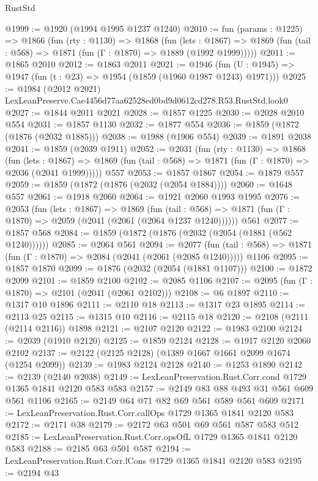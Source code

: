 \begin{lexlean}{RustStd}
\begin{coremodule}
@1999 := @1920 (@1994 @1995 @1237 @1240)
@2010 := fun (params : @1225) =>
  @1866
    (fun (rty : @1130) =>
    @1868
      (fun (lets : @1867) =>
      @1869 (fun (tail : @568) => @1871 (fun (Γ : @1870) => @1889 (@1992 @1999)))))
@2011 := @1865 @2010
@2012 := @1863 @2011
@2021 := @1946 (fun (U : @1945) => @1947 (fun (t : @23) => @1954 (@1859 (@1960 @1987 @1243) @1971)))
@2025 := @1984 (@2012 @2021) LexLeanPreserve.Cae4456d77aa62528ed0bd9d0612cd278.R53.RustStd.look0
@2027 := @1844 @2011 @2021
@2028 := @1857 @1225
@2030 := @2028 @2010 @554
@2031 := @1857 @1130
@2032 := @1877 @554
@2036 := @1859 (@1872 (@1876 (@2032 @1885)))
@2038 := @1988 (@1906 @554)
@2039 := @1891 @2038
@2041 := @1859 (@2039 @1911)
@2052 := @2031
    (fun (rty : @1130) =>
    @1868
      (fun (lets : @1867) =>
      @1869 (fun (tail : @568) => @1871 (fun (Γ : @1870) => @2036 (@2041 @1999)))))
    @557
@2053 := @1857 @1867
@2054 := @1879 @557
@2059 := @1859 (@1872 (@1876 (@2032 (@2054 @1884))))
@2060 := @1648 @557
@2061 := @1918 @2060
@2064 := @1921 @2060 @1993 @1995
@2076 := @2053
    (fun (lets : @1867) =>
    @1869
      (fun (tail : @568) => @1871 (fun (Γ : @1870) => @2059 (@2041 (@2061 (@2064 @1237 @1240))))))
    @561
@2077 := @1857 @568
@2084 := @1859 (@1872 (@1876 (@2032 (@2054 (@1881 (@562 @1240))))))
@2085 := @2064 @561
@2094 := @2077
    (fun (tail : @568) => @1871 (fun (Γ : @1870) => @2084 (@2041 (@2061 (@2085 @1240)))))
    @1106
@2095 := @1857 @1870
@2099 := @1876 (@2032 (@2054 (@1881 @1107)))
@2100 := @1872 @2099
@2101 := @1859 @2100
@2102 := @2085 @1106
@2107 := @2095 (fun (Γ : @1870) => @2101 (@2041 (@2061 @2102)))
@2108 := @6 @1897
@2110 := @1317 @10 @1896
@2111 := @2110 @18
@2113 := @1317 @23 @1895
@2114 := @2113 @25
@2115 := @1315 @10
@2116 := @2115 @18
@2120 := @2108 (@2111 (@2114 @2116)) @1898
@2121 := @2107 @2120
@2122 := @1983 @2100
@2124 := @2039 (@1910 @2120)
@2125 := @1859 @2124
@2128 := @1917 @2120 @2060 @2102
@2137 := @2122 (@2125 @2128) (@1389 @1667 @1661 @2099 @1674 (@1254 @2099))
@2139 := @1983 @2124 @2128
@2140 := @1253 @1890
@2142 := @2139 (@2140 @2038)
@2149 := LexLeanPreservation.Rust.Corr.cond @1729 @1365 @1841 @2120 @583 @583
@2157 := @2149 @83 @88 @493 @31 @561 @609 @561 @1106
@2165 := @2149 @64 @71 @82 @69 @561 @589 @561 @609
@2171 := LexLeanPreservation.Rust.Corr.callOps @1729 @1365 @1841 @2120 @583
@2172 := @2171 @38
@2179 := @2172 @63 @501 @69 @561 @587 @583 @512
@2185 := LexLeanPreservation.Rust.Corr.opsOfL @1729 @1365 @1841 @2120 @583
@2188 := @2185 @63 @501 @587
@2194 := LexLeanPreservation.Rust.Corr.lCons @1729 @1365 @1841 @2120 @583
@2195 := @2194 @43

\end{coremodule}
\end{lexlean}
